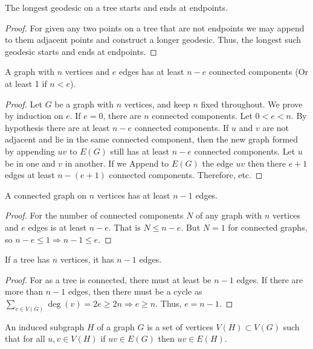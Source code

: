     \begin{theorem}
    The longest geodesic on a tree starts and ends at endpoints.
    \end{theorem}
    \begin{proof}
    For given any two points on a tree that are not endpoints we may append to them adjacent points and construct a longer geodesic. Thus, the longest such geodesic starts and ends at endpoints.
    \end{proof}
    \begin{theorem}
    A graph with $n$ vertices and $e$ edges has at least $n-e$ connected components (Or at least 1 if $n<e$).
    \end{theorem}
    \begin{proof}
    Let $G$ be a graph with $n$ vertices, and keep $n$ fixed throughout. We prove by induction on $e$. If $e=0$, there are $n$ connected components. Let $0<e < n$. By hypothesis there are at least $n-e$ connected components. If $u$ and $v$ are not adjacent and lie in the same connected component, then the new graph formed by appending $uv$ to $E(G)$ still has at least $n-e$ connected components. Let $u$ be in one and $v$ in another. If we Append to $E(G)$ the edge $uv$ then there $e+1$ edges at least $n-(e+1)$ connected components. Therefore, etc.
    \end{proof}
    \begin{theorem}
    A connected graph on $n$ vertices has at least $n-1$ edges.
    \end{theorem}
    \begin{proof}
    For the number of connected components $N$ of any graph with $n$ vertices and $e$ edges is at least $n-e$. That is $N\leq n-e$. But $N=1$ for connected graphs, so $n-e\leq 1 \Rightarrow n-1\leq e$.
    \end{proof}
    \begin{theorem}
    If a tree has $n$ vertices, it has $n-1$ edges.
    \end{theorem}
    \begin{proof} For as a tree is connected, there must at least be $n-1$ edges. If there are more than $n-1$ edges, then there must be a cycle as $\sum_{v\in V(G)} \deg(v) = 2e \geq 2n\Rightarrow e\geq n$. Thus, $e=n-1$. 
    \end{proof}
    \begin{definition}
    An induced subgraph $H$ of a graph $G$ is a set of vertices $V(H) \subset V(G)$ such that for all $u,v\in V(H)$ if $uv\in E(G)$ then $uv \in E(H)$.
    \end{definition}
